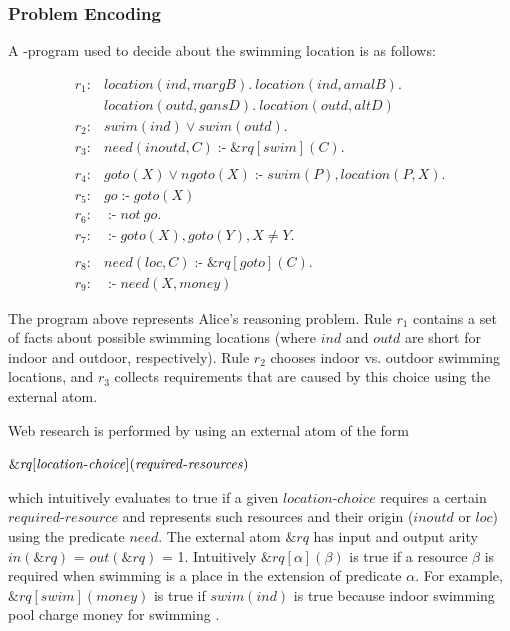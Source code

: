\documentclass[a4paper, titlepage]{article}
\newcommand{\ext}[3]{\ensuremath{\&{#1}[#2](#3)}}
\DeclareMathOperator{\leftimpl}{:-}
\begin{document}
\subsubsection{Problem Encoding}
A \hex-program used to decide about the swimming location is as 
follows:
\begin{exmp}
\label{swimExample}
\begin{align*}
r_1\colon& location(ind, margB). \ location(ind, amalB). \ \\& 
location(outd, gansD). \ location(outd, altD) \\  
r_2\colon& swim(ind) \vee swim(outd).\\ 
r_3\colon& need(inoutd, C) \leftimpl \ext{\mathit{rq}}
{\mathit{swim}}{\mathit{C}}. \\
\\
r_4\colon& goto(X) \vee ngoto(X) \leftimpl swim(P), 
location(P, X).\\
r_5\colon& go \leftimpl goto(X)\\
r_6\colon& \leftimpl not \ go. \\
r_7\colon& \leftimpl goto(X), goto(Y), X \neq Y. \\
\\
r_8\colon& \mathit{need}(loc, C) \leftimpl 
\ext{\mathit{rq}}{\mathit{goto}}{\mathit{C}}. \\ 
r_9\colon& \leftimpl need(X, money)
\end{align*}
\end{exmp}
The \hex{} program above represents Alice's reasoning 
problem. Rule $r_1$ contains a set of facts about possible 
swimming locations (where $\mathit{ind}$ and 
$\mathit{outd}$ are short for indoor and outdoor, 
respectively). Rule $r_2$ chooses indoor vs. outdoor 
swimming locations, and $r_3$ collects requirements that 
are caused by this choice using the external atom. 

Web research is performed by using an external atom of the 
form 
\\ \centerline{$\ext{\mathit{rq}}{\mathit{location}$-$
\mathit{choice}}{\mathit{required}$-$\mathit{resources}}$}
which intuitively 
evaluates to true if a given $\mathit{location}$-$\mathit{choice}$ 
requires a certain $\mathit{required}$-$\mathit{resource}$ and 
represents such resources  and their origin 
($\mathit{inoutd}$ or $\mathit{loc}$) using the predicate 
$\mathit{need}$. The external atom $\mathit{\&rq}$ has 
input and output arity $\mathit{in(\&rq)}$ = 
$\mathit{out(\&rq)}$ = 1. Intuitively  $\ext{\mathit{rq}}
{\mathit{\alpha}}{\mathit{\beta}}$ is true if a resource 
$\beta$ is required when swimming is a place in the 
extension of predicate $\alpha$. For example, 
$\ext{\mathit{rq}}{\mathit{swim}}{\mathit{money}}$ is true 
if $\mathit{swim(ind)}$ is true because indoor swimming 
pool charge money for swimming \cite{efikrs2015}. 
\end{document}
